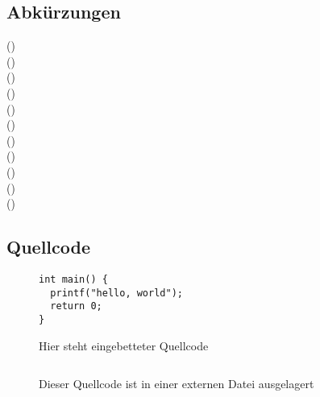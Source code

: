 \subsection{Abkürzungen}\label{subsec:abkuerzungen}
 ()\\
 ()\\
 ()\\
 ()\\
 ()\\
 ()\\
 ()\\
 ()\\
 ()\\
 ()\\
 ()

\subsection{Quellcode}\label{subsec:quellcode}
\begin{figure}[!ht]
    \begin{center}
        \begin{verbatim}
int main() {
  printf("hello, world");
  return 0;
}
        \end{verbatim}
        \caption{Hier steht eingebetteter Quellcode}\label{fig:hier-steht-eingebetteter-quellcode}
    \end{center}
\end{figure}

\begin{figure}[!ht]
    \begin{center}
        \inputminted{python}{anhang/example.py}
        \caption{Dieser Quellcode ist in einer externen Datei ausgelagert}\label{fig:dieser-quellcode-ist-in-einer-externen-datei-ausgelagert}
    \end{center}
\end{figure}
